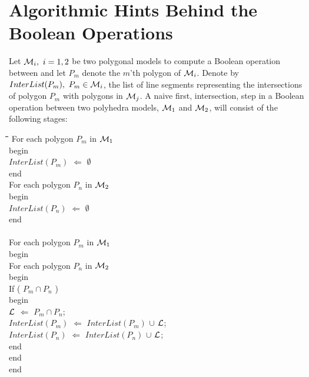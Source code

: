 
\section{Algorithmic Hints Behind the Boolean Operations}

Let ${\cal M}_i,~i = 1,2$ be two polygonal models to compute a Boolean
operation between and let $P_m$ denote the $m$'th polygon of ${\cal M}_i$.
Denote by $InterList( P_m ),~P_m \in {\cal M}_i$, the list of line
segments representing the intersections of polygon $P_m$ with polygons
in ${\cal M}_j$.  A naive first, intersection, step in a Boolean
operation between two polyhedra models, ${\cal M}_1$ and ${\cal M}_2$,
will consist of the following stages:
\begin{bf}
\begin{tt}
\begin{tabbing}
\hspace{2em}\=\hspace{2em}\=\hspace{2em}\=\hspace{2em}\=\hspace{2em}\=\hspace{2em}\=\kill
\> For each polygon $P_m$ in ${\cal M}_1$ \\
\> begin \\
\> \> $InterList( P_m )$ $\Leftarrow$ $\emptyset$ \\
\> end \\
\> For each polygon $P_n$ in ${\cal M}_2$ \\
\> begin \\
\> \> $InterList( P_n )$ $\Leftarrow$ $\emptyset$ \\
\> end \\
\\
\> For each polygon $P_m$ in ${\cal M}_1$ \\
\> begin \\
\> \> For each polygon $P_n$ in ${\cal M}_2$ \\
\> \> begin \\
\> \> \> If ( $P_m \cap P_n$ ) \\
\> \> \> begin \\
\> \> \> \> ${\cal L}$ $\Leftarrow$ $P_m \cap P_n$; \\
\> \> \> \> $InterList( P_m )$ $\Leftarrow$ $InterList( P_m )$ $\cup$ ${\cal L}$; \\
\> \> \> \> $InterList( P_n )$ $\Leftarrow$ $InterList( P_n )$ $\cup$ ${\cal L}$; \\
\> \> \> end \\
\> \> end \\
\> end
\end{tabbing}
\end{tt}
\end{bf}

